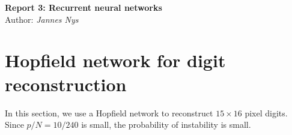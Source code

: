 \documentclass[10pt,a4paper]{article}
\begin{document}
\begin{center}
\Large\textbf{Report 3: Recurrent neural networks}\\
\large Author: \textit{Jannes Nys}
\end{center}


\section{Hopfield network for digit reconstruction}
In this section, we use a Hopfield network to reconstruct $15 \times 16$ pixel digits. Since $p/N = 10/240$ is small, the probability of instability is small.
\end{document}
